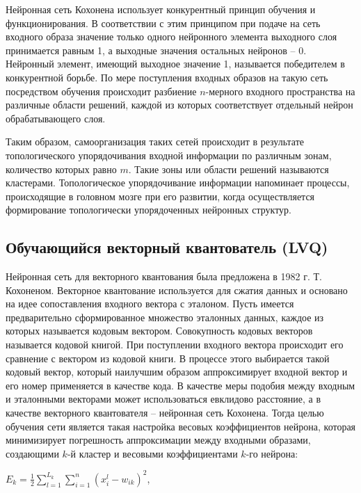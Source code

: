 \documentclass[bachelor, och, referat]{template}
\begin{document}
Нейронная сеть Кохонена использует конкурентный принцип обучения 
и функционирования. В соответствии с этим принципом при подаче 
на сеть входного образа значение только одного нейронного элемента 
выходного слоя принимается равным 1, а выходные значения остальных 
нейронов -- 0. Нейронный элемент, имеющий выходное значение 1, 
называется победителем в конкурентной борьбе. По мере поступления 
входных образов на такую сеть посредством обучения происходит 
разбиение $n$-мерного входного пространства на различные области 
решений, каждой из которых соответствует отдельный нейрон 
обрабатывающего слоя.

Таким образом, самоорганизация таких сетей происходит в результате 
топологического упорядочивания входной информации по различным
зонам, количество которых равно $m$. Такие зоны или области решений
называются кластерами. Топологическое упорядочивание информации
напоминает процессы, происходящие в головном мозге при его развитии, 
когда осуществляется формирование топологически упорядоченных
нейронных структур.

\subsection{Обучающийся векторный квантователь (LVQ)}

Нейронная сеть для векторного квантования была предложена в
1982 г. Т. Кохоненом. Векторное квантование используется для
сжатия данных и основано на идее сопоставления входного вектора с
эталоном. Пусть имеется предварительно сформированное множество 
эталонных данных, каждое из которых называется кодовым вектором. 
Совокупность кодовых векторов называется кодовой книгой. При
поступлении входного вектора происходит его сравнение с вектором из
кодовой книги. В процессе этого выбирается такой кодовый вектор,
который наилучшим образом аппроксимирует входной вектор и его
номер применяется в качестве кода. В качестве меры подобия
между входным и эталонными векторами может использоваться евклидово 
расстояние, а в качестве векторного квантователя -- нейронная
сеть Кохонена. Тогда целью обучения сети является такая настройка
весовых коэффициентов нейрона, которая минимизирует погрешность
аппроксимации между входными образами, создающими $k$-й кластер и
весовыми коэффициентами $k$-го нейрона:

\begin{center}
    $E_k = \frac{1}{2} \sum_{l = 1}^{L_k} \sum_{i = 1}^{n} (x_i^l - w_{ik})^2$,
\end{center}
\end{document}
